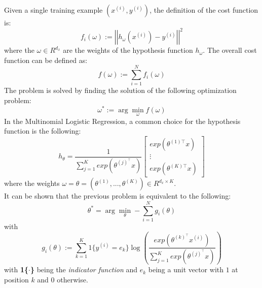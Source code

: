 \documentclass[a4paper,11pt,oneside]{book}
\begin{document}
Given a single training example $(x^{(i)}, y^{(i)})$, the definition of the cost function is:
\begin{equation}
f_i\left(\omega\right):=\left|\left|h_\omega\left(x^{(i)}\right)-y^{(i)}\right|\right|^2
\end{equation}
where the $\omega \in R^{d_{x}}$ are the weights of the hypothesis function $h_{\omega}$. The overall cost function can be defined as:
\begin{equation}
f\left(\omega\right):=\sum_{i=1}^{N}{f_i\left(\omega\right)}
\end{equation}
The problem is solved by finding the solution of the following optimization problem:
\begin{equation}
\omega^*:=\arg\min_\omega f\left(\omega\right)
\end{equation}
In the Multinomial Logistic Regression, a common choice for the hypothesis function is the following:
\begin{equation}
h_\theta=\frac{1}{\sum_{j=1}^{K}{exp\left(\theta^{(j)^\top}x\right)}}\begin{bmatrix}exp\left(\theta^{(1)\top}x\right)  \\ \vdots \\ exp\left(\theta^{(K)\top}x\right) \end{bmatrix}
\end{equation}
where the weights $\omega = \theta = (\theta^{(1)}, ..., \theta^{(K)}) \in R^{{d_{x}} \times K }$. \\
It can be shown that the previous problem is equivalent to the following:
\begin{equation}\label{EQ1.7}
\theta^*=\arg\min_\theta -\sum_{i=1}^{N}{g_i(\theta)}
\end{equation}
with
\begin{equation} \label{EQ1.8}
g_i\left(\theta\right):=\sum_{k=1}^{K}{1\{y^{(i)}=e_k\}\log{\left( \frac{exp(\theta^{(k)^\top}x^{(i)})}{\sum_{j=1}^{K}{exp( \theta^{(j)^\top}x )}} \right)}}
\end{equation}
with \textbf{1\{$\cdot$\}} being the \textit{indicator function} and $e_k$ being a unit vector with $1$ at position $k$ and $0$ otherwise.\cite{CITATION:2}
\end{document}

